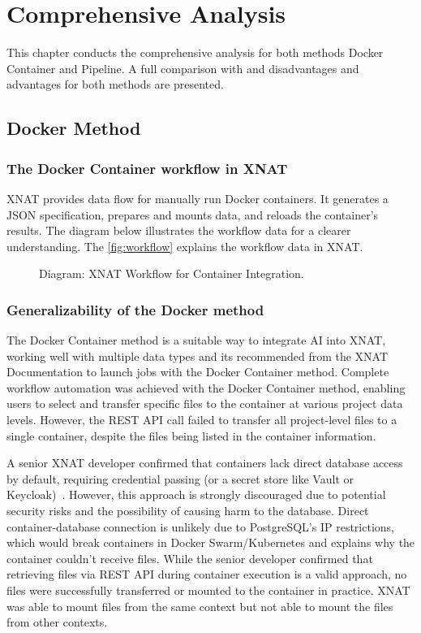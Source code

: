 \chapter{Comprehensive Analysis}
This chapter conducts the comprehensive analysis for both methods Docker Container and Pipeline. 
A full comparison with and disadvantages and advantages for both methods are presented.
\section{Docker Method}
\subsection{The Docker Container workflow in XNAT}

XNAT provides data flow for manually run Docker containers. It generates a JSON specification, prepares and mounts data, and reloads the container's results.
The diagram below illustrates the workflow data for a clearer understanding.  
The \autoref{fig:workflow} explains the workflow data in XNAT.

\begin{figure}[H]
    \centering
    \def\svgwidth{\linewidth} 
    
    \caption{Diagram: XNAT Workflow for Container Integration.}
    \label{fig:workflow}
\end{figure}

\subsection{Generalizability of the Docker method}
The Docker Container method is a suitable way to integrate AI into XNAT, working well with multiple data types and its recommended from the XNAT Documentation to launch jobs with the Docker Container method. Complete workflow automation was achieved with the Docker Container method, enabling users to select and transfer specific files to the container at various project data levels. However, the REST API call failed to transfer all project-level files to a single container, despite the files being listed in the container information.  

A senior XNAT developer confirmed that containers lack direct database access by default, requiring credential passing (or a secret store like Vault or Keycloak)~\cite{database}. However, this approach is strongly discouraged due to potential security risks and the possibility of causing harm to the database. Direct container-database connection is unlikely due to PostgreSQL's IP restrictions, which would break containers in Docker Swarm/Kubernetes and explains why the container couldn't receive files.
While the senior developer confirmed that retrieving files via REST API during container execution is a valid approach, no files were successfully transferred or mounted to the container in practice. 
XNAT was able to mount files from the same context but not able to mount the files from other contexts.


